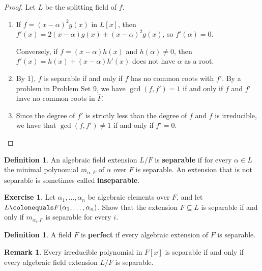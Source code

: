 \documentclass[12pt]{report}
\numberwithin{equation}{section}
\numberwithin{theorem}{chapter}
\theoremstyle{definition}
\newtheorem{definition}[theorem]{Definition}
\newtheorem{exercise}{Exercise}
\newtheorem*{basic properties}{Basic Properties}
\newtheorem*{Important Remark}{Important Remark}
\newtheorem{remark}[theorem]{Remark}
\newcommand{\df}[1]{{\bf #1}\index{#1}}
\begin{document}
\begin{proof} 
Let $L$ be the splitting field of $f$. 

\begin{enumerate}[label=\alph*),leftmargin=15pt]
\item If $f = (x-\alpha)^2g(x)$ in $L[x]$, then $f'(x) = 2(x - \alpha) g(x) + (x-\alpha)^2 g(x)$, so $f'(\alpha) = 0$. 

Conversely, if $f = (x-\alpha)h(x)$ and $h(\alpha) \neq 0$, then $f'(x) = h(x) + (x-\alpha)h'(x)$
  does not have $\alpha$ as a root.
  
\item By 1), $f$ is separable if and only if $f$ has no common roots with $f'$. By a problem in Problem Set 9, we have $\gcd(f, f') = 1$ if and only if $f$ and $f'$ have no common roots in $\overline{F}$. 

\item Since the degree of $f'$ is strictly less than the degree of $f$ and $f$ is irreducible, we have that $\gcd(f,f') \neq 1$ if and only if $f' = 0$.\qedhere
\end{enumerate}
\end{proof}





\begin{definition} 
An algebraic field extension $L/F$ is {\bf separable} if for every $\alpha \in L$ the minimal polynomial $m_{\alpha, F}$ of $\alpha$ over $F$ is separable. An extension that is not separable is sometimes called \df{inseparable}.
\end{definition}


\begin{exercise}\label{separable just check generators}
	Let $\alpha_1, \ldots, \alpha_n$ be algebraic elements over $F$, and let $L \colonequals F(\alpha_1, \ldots, \alpha_n)$. Show that the extension $F \subseteq L$ is separable if and only if $m_{\alpha_i, F}$ is separable for every $i$.
\end{exercise}



\begin{definition}
	A field $F$ is {\bf perfect} if every algebraic extension of $F$ is separable. 
\end{definition}


\begin{remark}
Every irreducible polynomial in $F[x]$ is separable if and only if every algebraic field extension $L/F$ is separable.
\end{remark}
\end{document}
